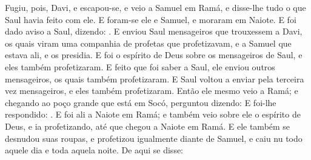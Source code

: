 {  Fugiu, pois, Davi, e escapou-se, e veio a Samuel em Ramá, e disse-lhe tudo o que Saul havia feito com ele. E foram-se ele e Samuel, e moraram em Naiote.
  E foi dado aviso a Saul, dizendo: .
  E enviou Saul mensageiros que trouxessem a Davi, os quais viram uma companhia de profetas que profetizavam, e a Samuel que estava ali, e os presidia. E foi o espírito de Deus sobre os mensageiros de Saul, e eles também profetizaram.
  E feito que foi saber a Saul, ele enviou outros mensageiros, os quais também profetizaram. E Saul voltou a enviar pela terceira vez mensageiros, e eles também profetizaram.
  Então ele mesmo veio a Ramá; e chegando ao poço grande que está em Socó, perguntou dizendo:  E foi-lhe respondido: .
  E foi ali a Naiote em Ramá; e também veio sobre ele o espírito de Deus, e ia profetizando, até que chegou a Naiote em Ramá.
  E ele também se desnudou suas roupas, e profetizou igualmente diante de Samuel, e caiu nu todo aquele dia e toda aquela noite. De aqui se disse: 
\par }

